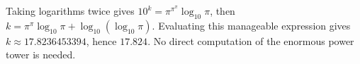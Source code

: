 Taking logarithms twice gives $10^k=\pi^{\pi^\pi}\log_{10}\pi$, then $k=\pi^\pi\log_{10}\pi+\log_{10}(\log_{10}\pi)$. Evaluating this manageable expression gives $k\approx17.8236453394$, hence $\boxed{17.824}$. No direct computation of the enormous power tower is needed.
